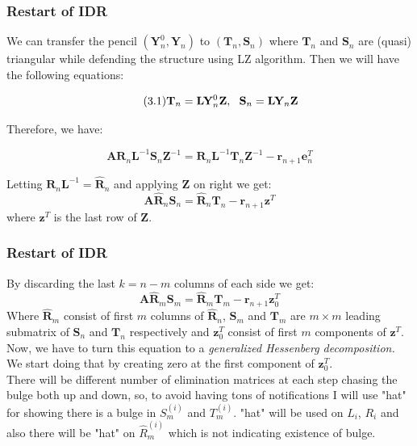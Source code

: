 \documentclass[mathserif]{beamer}
\begin{document}
\begin{frame}
\frametitle{Restart of IDR}
We can transfer the pencil $(\mathbf{Y}_n^0,\mathbf{Y}_n)$ to $(\mathbf{T}_n,\mathbf{S}_n)$ where $\mathbf{T}_n$ and $\mathbf{S}_n$ are (quasi) triangular while defending the structure using LZ algorithm. \pause Then we will have the following equations:

\[\tag{3.1}\mathbf{T}_n=\mathbf{L}\mathbf{Y}_n^0\mathbf{Z},\hspace{.09in} \mathbf{S}_n=\mathbf{L}\mathbf{Y}_n\mathbf{Z}\]

Therefore, we have:

\[\mathbf{A}\mathbf{R}_n\mathbf{L}^{-1}\mathbf{S}_n\mathbf{Z}^{-1}=\mathbf{R}_n \mathbf{L}^{-1}\mathbf{T}_n\mathbf{Z}^{-1} - \mathbf{r}_{n+1}\mathbf{e}_n^T\]

\pause Letting $\mathbf{R}_n\mathbf{L}^{-1}=\mathbf{\hat R}_n$ and applying $\mathbf{Z}$ on right we get:
\[\mathbf{A} \mathbf{\hat R}_n \mathbf{S}_n=\mathbf{\hat R}_n \mathbf{T}_n - \mathbf{r}_{n+1}\mathbf{z}^T\]  where $\mathbf{z}^T$ is the last row of $\mathbf{Z}$.
\end{frame}


\begin{frame}
\frametitle{Restart of IDR}
By discarding the last $k=n-m$ columns of each side we get:
\[\mathbf{A}\mathbf{\hat R}_m\mathbf{S}_m=\mathbf{\hat R}_m \mathbf{T}_m - \mathbf{r}_{n+1}\mathbf{z}_0^T\] Where $\mathbf{\hat R}_m$ consist of first $m$ columns of $\mathbf{\hat R}_n$, $\mathbf{S}_m$ and $\mathbf{T}_m$ are $m \times m$ leading submatrix of $\mathbf{S}_n$ and  $\mathbf{T}_n$ respectively and $\mathbf{z}_0^T$ consist of first $m$ components of $\mathbf{z}^T$.\\

\pause Now, we have to turn this equation to a \textit{generalized Hessenberg decomposition.}
We start doing that by creating zero at the first component of $\mathbf{z}_0^T$.\\
\vspace{.1in}
\pause There will be different number of elimination matrices at each step chasing the bulge both up and down, so, to avoid having tons of notifications I will use "hat" for showing there is a bulge in $S_m^{(i)}$ and $T_m^{(i)}$. "hat" will be used on $L_i$, $R_i$ and also there will be "hat" on $\hat R_m^{(i)}$ which is not indicating existence of bulge.  \\
\end{frame}
\end{document}

